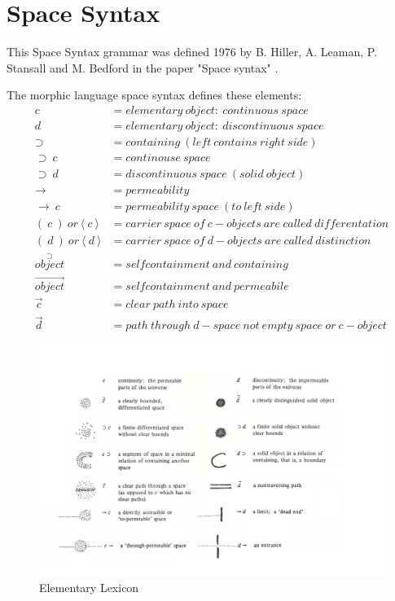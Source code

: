 \documentclass[11pt, a4paper]{report}
\begin{document}
\pagebreak
\section{Space Syntax}
This Space Syntax grammar was defined 1976 by B. Hiller, A. Leaman, P. Stansall and M. Bedford in the paper "Space syntax" \citep{shapeGrammars:1972}.

The morphic language space syntax defines these elements:
\begin{align}
c &= elementary\ object:\ continuous\ space  \\
d &= elementary\ object:\ discontinuous\ space  \\
\supset &= containing\ (left\ contains\ right\ side)  \\
\supset\ c &= continouse\ space  \\
\supset\ d &= discontinuous\ space\ (solid\ object) \\
\rightarrow &= permeability \\
\rightarrow\ c &= permeability\ space\ (to\ left\ side) \\
(\ c\ )\ or\ \langle\ c\ \rangle  &= carrier\ space\ of\ c-objects\ are\ called\ differentation  \\
(\ d\ )\ or\ \langle\ d\ \rangle &= carrier\ space\ of\ d-objects\ are\ called\ distinction  \\
\overset{\supset}{object} &= selfcontainment\ and\ containing \\
\overset{\rightarrow}{object} &= selfcontainment\ and\ permeabile \\
\overset{\rightarrow}{c} &= clear\ path\ into\ space \\
\overset{\rightarrow}{d} &= path\ through\ d-space\ not\ empty\ space\ or\ c-object 
\end{align}
\begin{figure}[!h]
    \centering
    \includegraphics[width=\textwidth]{spacesyntax_elementary.png}
    \caption{Elementary Lexicon\citep{spaceSyntax:1976}}\label{fig:Space Syntax/Elementary Lexicon}
\end{figure}
\end{document}

